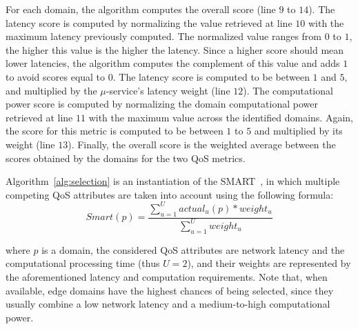 For each domain, the algorithm computes the overall score (line $9$ to $14$). The latency score is computed by normalizing the value retrieved at line $10$ with the maximum latency previously computed. The normalized value ranges from $0$ to $1$, the higher this value is the higher the latency. Since a higher score should mean lower latencies, the algorithm computes the complement of this value and adds $1$ to avoid scores equal to $0$. The latency score is computed to be between $1$ and $5$, and multiplied by the $\mu$-service's latency weight (line $12$). The computational power score is computed by normalizing the domain computational power retrieved at line $11$ with the maximum value across the identified domains. Again, the score for this metric is computed to be between $1$ to $5$ and multiplied by its weight (line $13$). Finally, the overall score is the weighted average between the scores obtained by the domains for the two QoS metrics.

Algorithm~\ref{alg:selection} is an instantiation of the SMART~\cite{Olson1996}, in which multiple competing QoS attributes are taken into account using the following formula:
{\small
\begin{equation}
Smart(p) = \frac{\sum_{u=1}^{U} actual_{u}(p)*weight_u}{\sum_{u=1}^{U}weight_u} \label{eq:smart}
\end{equation}
}%

\noindent
where $p$ is a domain, the considered QoS attributes are network latency and the computational processing time (thus $U = 2$), and their weights are represented by the aforementioned latency and computation requirements. Note that, when available, edge domains have the highest chances of being selected, since they usually combine a low network latency and a medium-to-high computational power. 


